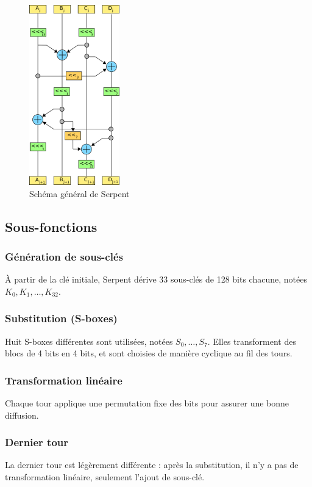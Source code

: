 \documentclass[12pt,a4paper]{report}
\begin{document}
\begin{figure}[h]
    \centering
    \includegraphics[width=0.35\textwidth]{assets/serpent-global.png}
    \caption{Schéma général de Serpent}
\end{figure}

\subsection{Sous-fonctions}

\subsubsection{Génération de sous-clés}
À partir de la clé initiale, Serpent dérive 33 sous-clés de 128 bits chacune, notées $K_0, K_1, \dots, K_{32}$.

\subsubsection{Substitution (S-boxes)}
Huit S-boxes différentes sont utilisées, notées $S_0, \dots, S_7$.  
Elles transforment des blocs de 4 bits en 4 bits, et sont choisies de manière cyclique au fil des tours.

\subsubsection{Transformation linéaire}
Chaque tour applique une permutation fixe des bits pour assurer une bonne diffusion.

\subsubsection{Dernier tour}
La dernier tour est légèrement différente : après la substitution, il n’y a pas de transformation linéaire, seulement l’ajout de sous-clé.
\end{document}

